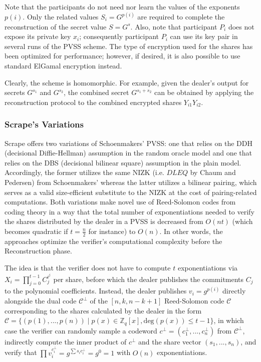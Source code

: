 \documentclass[letterpaper,twocolumn,10pt]{article}
\theoremstyle{definition}
\theoremstyle{remark}
\begin{document}
Note that the participants do not need nor learn the values of the exponents $p(i)$. Only the related values $S_i = G^{p(i)}$ are required to complete the reconstruction of the secret value $S = G^s$. Also, note that participant $P_i$ does not expose its private key $x_i$; consequently participant $P_i$ can use its key pair in several runs of the PVSS scheme. The type of encryption used for the shares has been optimized for performance; however, if desired, it is also possible to use standard ElGamal encryption instead.

Clearly, the scheme is homomorphic. For example, given the dealer's output for secrets $G^{s_1}$ and $G^{s_2}$, the combined secret $G^{s_1 + s_2}$ can be obtained by applying the reconstruction protocol to the combined encrypted shares $Y_{i1} Y_{i2}$.

\subsubsection{Scrape's Variations}
Scrape offers two variations of Schoenmakers' PVSS: one that relies on the DDH (decisional Diffie-Hellman) assumption in the random oracle model and one that relies on the DBS (decisional bilinear square) assumption in the plain model. Accordingly, the former utilizes the same NIZK (i.e. $DLEQ$ by Chaum and Pedersen) from Schoenmakers' whereas the latter utilizes a bilinear pairing, which serves as a valid size-efficient substitute to the NIZK at the cost of pairing-related computations. Both variations make novel use of Reed-Solomon codes from coding theory in a way that the total number of exponentiations needed to verify the shares distributed by the dealer in a PVSS is decreased from $O(n t)$ (which becomes quadratic if $t = \frac{n}{2}$ for instance) to $O(n)$. In other words, the approaches optimize the verifier's computational complexity before the Reconstruction phase.

The idea is that the verifier does not have to compute $t$ exponentiations via $X_i = \prod_{j = 0}^{t - 1} C_j^{i^j}$ per share, before which the dealer publishes the commitments $C_j$ to the polynomial coefficients. Instead, the dealer publishes $v_i = g^{p(i)}$ directly alongside the dual code $\mathcal{C}^\perp$ of the $[n, k, n - k + 1]$ Reed-Solomon code $\mathcal{C}$ corresponding to the shares calculated by the dealer in the form $\mathcal{C} = \{(p(1), ..., p(n)) \mid p(x) \in \mathbb{Z}_q[x], \text{deg}(p(x)) \leq t - 1\}$, in which case the verifier can randomly sample a codeword $c^\perp = (c_1^\perp, ..., c_n^\perp)$ from $\mathcal{C}^\perp$, indirectly compute the inner product of $c^\perp$ and the share vector $(s_1, ..., s_n)$, and verify that $\prod v_i^{c_i^\perp} = g^{\sum s_i c_i^\perp} = g^0 = 1$ with $O(n)$ exponentiations.
\end{document}
